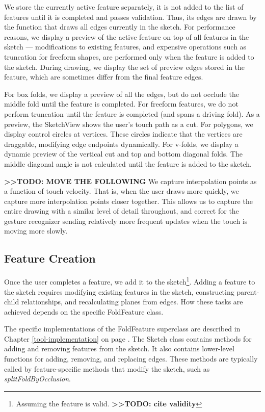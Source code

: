 We store the currently active feature separately, it is not added to the
list of features until it is completed and passes validation. Thus, its
edges are drawn by the function that draws all edges currently in the
sketch. For performance reasons, we display a preview of the active
feature on top of all features in the sketch --- modifications to
existing features, and expensive operations such as truncation for
freeform shapes, are performed only when the feature is added to the
sketch. During drawing, we display the set of preview edges stored in
the feature, which are sometimes differ from the final feature edges.

For box folds, we display a preview of all the edges, but do not occlude
the middle fold until the feature is completed. For freeform features,
we do not perform truncation until the feature is completed (and spans a
driving fold). As a preview, the SketchView shows the user's touch path
as a cut. For polygons, we display control circles at vertices. These
circles indicate that the vertices are draggable, modifying edge
endpoints dynamically. For v-folds, we display a dynamic preview of the
vertical cut and top and bottom diagonal folds. The middle diagonal
angle is not calculated until the feature is added to the sketch.

\textbf{\textgreater{}\textgreater{}TODO: MOVE THE FOLLOWING} We capture
interpolation points as a function of touch velocity. That is, when the
user draws more quickly, we capture more interpolation points closer
together. This allows us to capture the entire drawing with a similar
level of detail throughout, and correct for the gesture recognizer
sending relatively more frequent updates when the touch is moving more
slowly.

\subsection{Feature Creation}\label{feature-creation}

Once the user completes a feature, we add it to the sketch\footnote{Assuming
  the feature is valid. \textbf{\textgreater{}\textgreater{}TODO: cite
  validity}}. Adding a feature to the sketch requires modifying existing
features in the sketch, constructing parent-child relationships, and
recalculating planes from edges. How these tasks are achieved depends on
the specific FoldFeature class.

The specific implementations of the FoldFeature superclass are described
in Chapter \ref{tool-implementation} on page
\pageref{tool-implementation}. The Sketch class contains methods for
adding and removing features from the sketch. It also contains
lower-level functions for adding, removing, and replacing edges. These
methods are typically called by feature-specific methods that modify the
sketch, such as \emph{splitFoldByOcclusion}.

